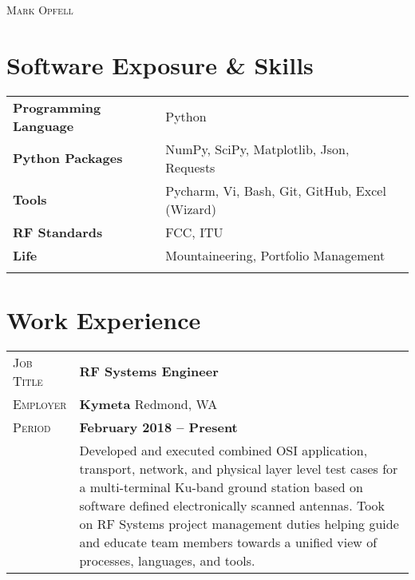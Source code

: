 \documentclass[a4paper, oneside, final]{scrartcl}
\newcommand{\gray}{\rowcolor[gray]{.90}} %
\begin{document}
\begin{center} %

\pdfpageheight 11in 
\pdfpagewidth 8.5in


{\fontsize{36}{36}\selectfont\scshape Mark Opfell} 
\vspace{1.16 cm} %


\section{Software Exposure \& Skills}
\begin{tabular}{ @{} >{\bfseries}l @{\hspace{6ex}} l }
Programming Language & Python\\
Python Packages & NumPy, SciPy, Matplotlib, Json, Requests \\
Tools & Pycharm, Vi, Bash, Git, GitHub, Excel (Wizard)\\
RF Standards & FCC, ITU \\
Life & Mountaineering, Portfolio Management  \\
\\
\end{tabular}

\section{Work Experience}

\begin{tabularx}{0.97\linewidth}{>{\raggedleft\scshape}p{2cm}X}
\gray Job Title & \textbf{RF Systems Engineer}\\
\gray Employer & \textbf{Kymeta} \hfill Redmond, WA\\
\gray Period & \textbf{February 2018 -- Present}\\
&
\vspace{-0.15 cm}
Developed and executed combined OSI application, transport, network, and physical layer level test cases for a multi-terminal Ku-band ground station based on software defined electronically scanned antennas. 
\newline
Took on RF Systems project management duties helping guide and educate team members towards a unified view of processes, languages, and tools. 
\\
\end{tabularx}


\end{center}
\end{document}
